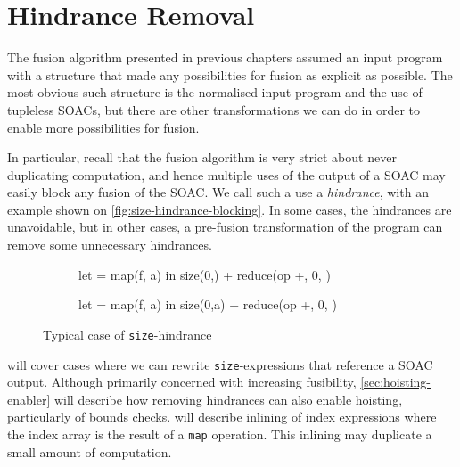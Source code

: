 \chapter{Hindrance Removal}
\label{chap:hindrance-removal}

The fusion algorithm presented in previous chapters assumed an input
program with a structure that made any possibilities for fusion as
explicit as possible.  The most obvious such structure is the
normalised input program and the use of tupleless SOACs, but there are
other transformations we can do in order to enable more possibilities
for fusion.

In particular, recall that the fusion algorithm is very strict about
never duplicating computation, and hence multiple uses of the output
of a SOAC may easily block any fusion of the SOAC.  We call such a use
a \textit{hindrance}, with an example shown on
\cref{fig:size-hindrance-blocking}.  In some cases, the hindrances are
unavoidable, but in other cases, a pre-fusion transformation of the
program can remove some unnecessary hindrances.

\begin{figure}
\begin{subfigure}[t]{.5\textwidth}
\begin{colorcode}
let  = map(f, a) in
size(0,) + reduce(op +, 0, )
\end{colorcode}
\end{subfigure}%
\begin{subfigure}[t]{.5\textwidth}
\begin{colorcode}
let  = map(f, a) in
size(0,a) + reduce(op +, 0, )
\end{colorcode}
\end{subfigure}%
\caption{Typical case of \texttt{size}-hindrance}
\label{fig:size-hindrance}
\end{figure}

 will cover cases where we can
rewrite \texttt{size}-expressions that reference a SOAC output.
Although primarily concerned with increasing fusibility,
\cref{sec:hoisting-enabler} will describe how removing hindrances can
also enable hoisting, particularly of bounds checks.
 will describe inlining of index
expressions where the index array is the result of a \texttt{map}
operation.  This inlining may duplicate a small amount of computation.

